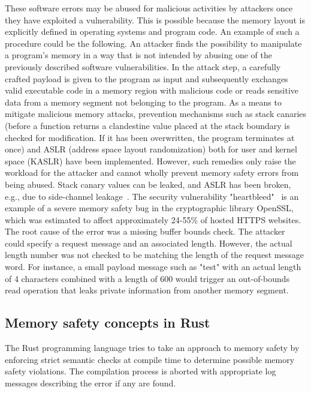 \documentclass[11pt,
  oneside,openany,    %
]{scrreprt}
\begin{document}
These software errors may be abused for malicious activities by attackers once they have exploited a vulnerability. This is possible because the memory layout is explicitly defined in operating systems and program code. An example of such a procedure could be the following. An attacker finds the possibility to manipulate a program's memory in a way that is not intended by abusing one of the previously described software vulnerabilities. In the attack step, a carefully crafted payload is given to the program as input and subsequently exchanges valid executable code in a memory region with malicious code or reads sensitive data from a memory segment not belonging to the program. As a means to mitigate malicious memory attacks, prevention mechanisms such as stack canaries (before a function returns a clandestine value placed at the stack boundary is checked for modification. If it has been overwritten, the program terminates at once) and ASLR (address space layout randomization) both for user and kernel space (KASLR) have been implemented. However, such remedies only raise the workload for the attacker and cannot wholly prevent memory safety errors from being abused. Stack canary values can be leaked, and ASLR has been broken, e.g., due to side-channel leakage~\cite{KASLRbreak, shadowAndStackCanary, memsafetyHui}. The security vulnerability "heartbleed"~\cite{heartbleed} is an example of a severe memory safety bug in the cryptographic library OpenSSL, which was estimated to affect approximately 24-55\% of hosted HTTPS websites. The root cause of the error was a missing buffer bounds check. The attacker could specify a request message and an associated length. However, the actual length number was not checked to be matching the length of the request message word. For instance, a small payload message such as "test" with an actual length of 4 characters combined with a length of 600 would trigger an out-of-bounds read operation that leaks private information from another memory segment. 

\subsection{Memory safety concepts in Rust}

The Rust programming language tries to take an approach to memory safety by enforcing strict semantic checks at compile time to determine possible memory safety violations. The compilation process is aborted with appropriate log messages describing the error if any are found.
\end{document}
